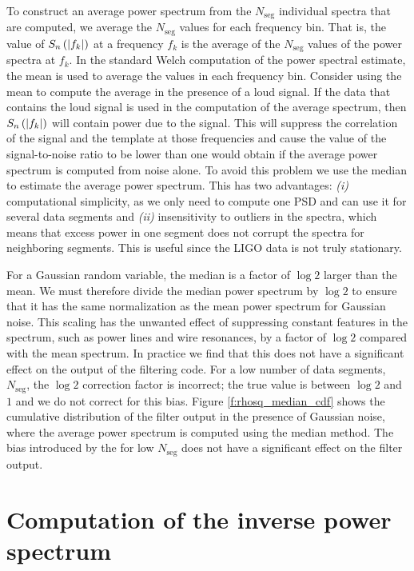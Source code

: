 To construct an average power spectrum from the $N_\mathrm{seg}$ individual
spectra that are computed, we average the $N_\mathrm{seg}$ values for each
frequency bin. That is, the value of $S_n\left(\left|f_{k}\right|\right)$ at a frequency $f_k$ is the
average of the $N_\mathrm{seg}$ values of the power spectra at $f_k$. In the
standard Welch computation of the power spectral estimate, the mean is used to
average the values in each frequency bin.  Consider using the mean to compute
the average in the presence of a loud signal. If the data that contains the
loud signal is used in the computation of the average spectrum, then $S_n\left(\left|f_{k}\right|\right)$
will contain power due to the signal. This will suppress the
correlation of the signal and the template at those frequencies and cause the
value of the signal-to-noise ratio to be lower than one would obtain if the
average power spectrum is computed from noise alone.  To avoid this problem we
use the median to estimate the average power spectrum. This has two
advantages: \emph{(i)} computational simplicity, as we only need to compute
one PSD and can use it for several data segments and \emph{(ii)} insensitivity
to outliers in the spectra, which means that excess power in one segment does
not corrupt the spectra for neighboring segments. This is useful since the
LIGO data is not truly stationary.

For a  Gaussian random variable, the median is a
factor of $\log 2$ larger than the mean. We must therefore divide the median
power spectrum by $\log 2$ to ensure that it has the same normalization as the
mean power spectrum for Gaussian noise. This scaling has the unwanted effect
of suppressing constant features in the spectrum, such as power lines and wire
resonances, by a factor of $\log 2$ compared with the mean spectrum. In
practice we find that this does not have a significant effect on the output of
the filtering code.  For a low number of data segments,
$N_\mathrm{seg}$, the $\log 2$ correction factor is incorrect; the true value
is between $\log 2$ and $1$ and we do not correct for this bias. Figure
\ref{f:rhosq_median_cdf} shows the cumulative distribution of the filter
output in the presence of Gaussian noise, where the average power spectrum is
computed using the median method.  The bias introduced by the
for low $N_\mathrm{seg}$ does not have a significant
effect on the filter output.

\section{Computation of the inverse power spectrum}
\label{ss:invspec}

